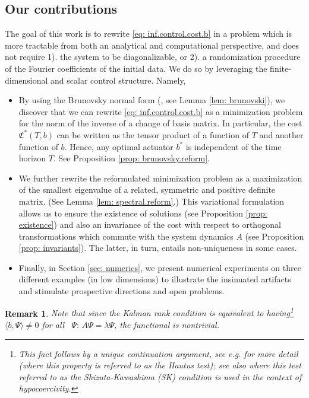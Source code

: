 \documentclass[journal,twoside,web]{ieeecolor}
\newtheorem{remark}{Remark}
\begin{document}
	\subsection{Our contributions}
	
	The goal of this work is to rewrite \eqref{eq: inf.control.cost.b} in a problem which is more tractable from both an analytical and computational perspective, and does not require 1). the system to be diagonalizable, or 2). a randomization procedure of the Fourier coefficients of the initial data. 
	We do so by leveraging the finite-dimensional and scalar control structure. Namely, 
\begin{itemize}
	\item By using the Brunovsky normal form (\cite{brunovsky1970classification}, see Lemma \ref{lem: brunovski}), we discover that we can rewrite \eqref{eq: inf.control.cost.b} as a minimization problem for the norm of the inverse of a change of basis matrix. In particular, the cost $\mathfrak{C}^*(T,b)$ can be written as the tensor product of a function of $T$ and another function of $b$. Hence, any optimal actuator $b^*$ is independent of the time horizon $T$.
	 See Proposition \ref{prop: brunovsky.reform}. 
	\smallskip 
	
	\item We further rewrite the reformulated minimization problem as a maximization of the smallest eigenvalue of a related, symmetric and positive definite matrix. (See Lemma \ref{lem: spectral.reform}.) This variational formulation allows us to ensure the existence of solutions (see Proposition \ref{prop: existence}) and also an invariance of the cost with respect to orthogonal transformations which commute with the system dynamics $A$ (see Proposition \ref{prop: invariants}). The latter, in turn, entails non-uniqueness in some cases. 
	\smallskip
	
	\item Finally, in Section \ref{sec: numerics}, we present numerical experiments on three different examples (in low dimensions) to illustrate the insinuated artifacts and stimulate prospective directions and open problems.
	\end{itemize}
	
	\begin{remark}
	Note that since the Kalman rank condition is equivalent to having\footnote{This fact follows by a unique continuation argument, see e.g. \cite[Section 1.5]{tucsnak2009observation} for more detail (where this property is referred to as the Hautus test); see also \cite[Lem. 1]{beauchard2011large} where this test referred to as the Shizuta-Kawashima (SK) condition is used in the context of hypocoercivity.} $\langle b,\Psi\rangle \neq 0$ for all  $\Psi: \, A\Psi = \lambda \Psi$, the functional is nontrivial. 
	\end{remark}
	
\end{document}
